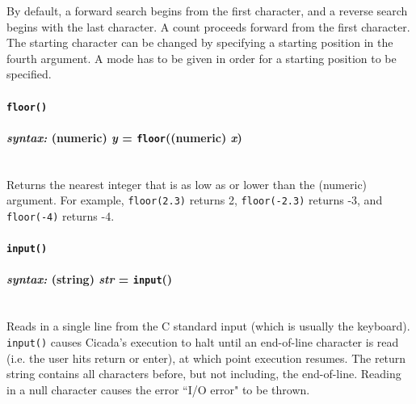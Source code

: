 \documentclass{article}
\begin{document}
By default, a forward search begins from the first character, and a reverse search begins with the last character.  A count proceeds forward from the first character.  The starting character can be changed by specifying a starting position in the fourth argument.  A mode has to be given in order for a starting position to be specified.\\






\paragraph{\texttt{floor()}\\\\
\normalfont \emph{syntax: } (numeric) \emph{y} = \texttt{floor}((numeric) \emph{x})\\\\}

Returns the nearest integer that is as low as or lower than the (numeric) argument.  For example, \verb$floor(2.3)$ returns 2, \verb$floor(-2.3)$ returns -3, and \verb$floor(-4)$ returns -4.\\






\paragraph{\texttt{input()}\\\\
\normalfont \emph{syntax: } (string) \emph{str} = \texttt{input}()\\\\}

Reads in a single line from the C standard input (which is usually the keyboard).  \texttt{input()} causes Cicada's execution to halt until an end-of-line character is read (i.e. the user hits return or enter), at which point execution resumes.  The return string contains all characters before, but not including, the end-of-line.  Reading in a null character causes the error ``I/O error" to be thrown.\\

\end{document}
